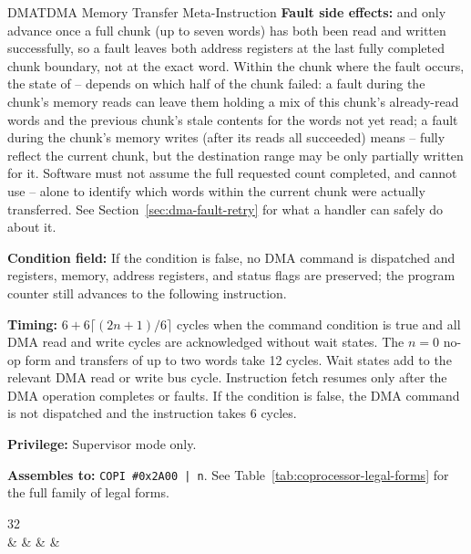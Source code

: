 \begin{instructionbox}{DMAT}{DMA Memory Transfer Meta-Instruction}
	\textbf{Fault side effects:}  and  only advance once a full chunk (up to seven words) has both been
	read and written successfully, so a fault leaves both address registers at the last fully completed chunk
	boundary, not at the exact word. Within the chunk where the fault occurs, the state of -- depends
	on which half of the chunk failed: a fault during the chunk's memory reads can leave them holding a mix of this
	chunk's already-read words and the previous chunk's stale contents for the words not yet read; a fault during
	the chunk's memory writes (after its reads all succeeded) means -- fully reflect the current
	chunk, but the destination range may be only partially written for it. Software must not assume the full
	requested count completed, and cannot use -- alone to identify which words within the current
	chunk were actually transferred. See Section~\ref{sec:dma-fault-retry} for what a handler can safely do about it.

	\textbf{Condition field:} If the condition is false, no DMA command is dispatched and registers, memory, address
	registers, and status flags are preserved; the program counter still advances to the following instruction.

	\textbf{Timing:} $6 + 6\lceil (2n + 1)/6 \rceil$ cycles when the command condition is true and all DMA read and write
	cycles are acknowledged without wait states. The $n = 0$ no-op form and transfers of up to two words take 12 cycles. Wait states add to the relevant DMA read or write bus cycle. Instruction fetch resumes only after the DMA
	operation completes or faults. If the condition is false, the DMA command is not dispatched and the instruction takes 6
	cycles.

	\textbf{Privilege:} Supervisor mode only.

	\textbf{Assembles to:} \texttt{COPI \#0x2A00 | n}. See Table~\ref{tab:coprocessor-legal-forms} for the full family of legal forms.

	\begin{center}
		\begin{bytefield}[bitwidth=1.1em]{32}
			 \\
			 &
			 &
			 &
			 &
		\end{bytefield}
	\end{center}


\end{instructionbox}
